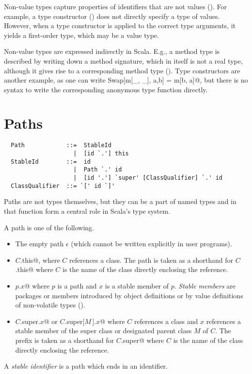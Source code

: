 Non-value types capture properties of identifiers that are not values
(). For example, a type constructor () does not directly specify a type of values. However, when a type constructor is applied to the correct type arguments, it yields a first-order type, which may be a value type. 

Non-value types are expressed indirectly in Scala. E.g., a method type is described by writing down a method signature, which in itself is not a real type, although it  gives rise to a corresponding method type (). Type constructors are another example, as one can write \lstinline@type Swap[m[_, _], a,b] = m[b, a]@, but there is no syntax to write the corresponding anonymous type function directly.

\section{Paths}\label{sec:paths}\label{sec:stable-ids}

\syntax\begin{lstlisting}
  Path            ::=  StableId
                    |  [id `.'] this
  StableId        ::=  id
                    |  Path `.' id
                    |  [id '.'] `super' [ClassQualifier] `.' id
  ClassQualifier  ::= `[' id `]'
\end{lstlisting}

Paths are not types themselves, but they can be a part of named types
and in that function form a central role in Scala's type system.

A path is one of the following.
\begin{itemize}
\item
The empty path $\epsilon$ (which cannot be written explicitly in user programs).
\item
\lstinline@$C$.this@, where $C$ references a class. 
The path  is taken as a shorthand for \lstinline@$C$.this@ where 
$C$ is the name of the class directly enclosing the reference. 
\item
\lstinline@$p$.$x$@ where $p$ is a path and $x$ is a stable member of $p$.
{\em Stable members} are packages or members introduced by object definitions or 
by value definitions of non-volatile types
(). 

\item
\lstinline@$C$.super.$x$@ or \lstinline@$C$.super[$M\,$].$x$@
where $C$ references a class and $x$ references a 
stable member of the super class or designated parent class $M$ of $C$. 
The prefix  is taken as a shorthand for \lstinline@$C$.super@ where 
$C$ is the name of the class directly enclosing the reference. 
\end{itemize}
A {\em stable identifier} is a path which ends in an identifier.

